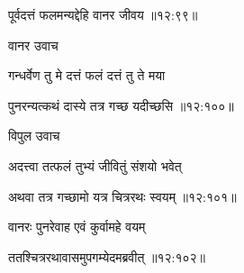{\devanagarifont पूर्वदत्तं फलमन्यद्देहि वानर जीवय {॥१२:९९॥} \veg\dontdisplaylinenum }%

{\devanagarifont वानर उवाच {\dandab}\dontdisplaylinenum  }%
 
{\devanagarifont गन्धर्वेण तु मे दत्तं फलं दत्तं तु ते मया \thinspace{\danda} \dontdisplaylinenum }%


{\devanagarifont पुनरन्यत्कथं दास्ये तत्र गच्छ यदीच्छसि {॥१२:१००॥} \veg\dontdisplaylinenum }%
 
{\devanagarifont विपुल उवाच {\dandab}\dontdisplaylinenum  }%
 
{\devanagarifont अदत्त्वा तत्फलं तुभ्यं जीवितुं संशयो भवेत् \thinspace{\danda} \dontdisplaylinenum }%


{\devanagarifont अथवा तत्र गच्छामो यत्र चित्ररथः स्वयम् {॥१२:१०१॥} \veg\dontdisplaylinenum }%

{\devanagarifont वानरः पुनरेवाह एवं कुर्वामहे वयम् \thinspace{\dandab} \dontdisplaylinenum }%


{\devanagarifont ततश्चित्ररथावासमुपगम्येदमब्रवीत् {॥१२:१०२॥} \veg\dontdisplaylinenum }%


